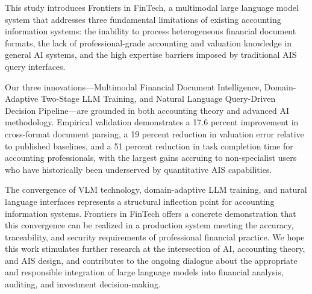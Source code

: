 \documentclass[12pt,letterpaper]{article}
\begin{document}
This study introduces Frontiers in FinTech, a multimodal large language model
system that addresses three fundamental limitations of existing
accounting information systems: the inability to process heterogeneous
financial document formats, the lack of professional-grade accounting
and valuation knowledge in general AI systems, and the high expertise
barriers imposed by traditional AIS query interfaces.

Our three innovations---Multimodal Financial Document Intelligence,
Domain-Adaptive Two-Stage LLM Training, and Natural Language
Query-Driven Decision Pipeline---are grounded in both accounting theory
and advanced AI methodology.
Empirical validation demonstrates a 17.6 percent improvement in
cross-format document parsing, a 19 percent reduction in valuation
error relative to published baselines, and a 51 percent reduction in
task completion time for accounting professionals, with the largest
gains accruing to non-specialist users who have historically been
underserved by quantitative AIS capabilities.

The convergence of VLM technology, domain-adaptive LLM training, and
natural language interfaces represents a structural inflection point
for accounting information systems.
Frontiers in FinTech offers a concrete demonstration that this convergence can be
realized in a production system meeting the accuracy, traceability,
and security requirements of professional financial practice.
We hope this work stimulates further research at the intersection of
AI, accounting theory, and AIS design, and contributes to the ongoing
dialogue about the appropriate and responsible integration of large
language models into financial analysis, auditing, and investment
decision-making.

\newpage
\singlespacing
\end{document}
